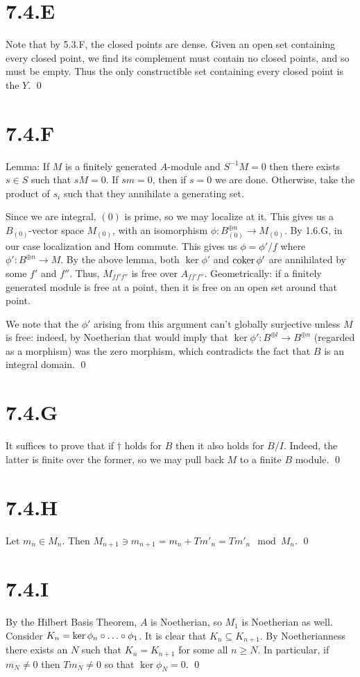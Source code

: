 \documentclass{article}
\begin{document}
\section{7.4.E}
Note that by 5.3.F, the closed points are dense. Given an open set containing
every closed point, we find its complement must contain no closed points, and
so must be empty. Thus the only constructible set containing every closed point
is the $Y$. \qed

\section{7.4.F}
Lemma: If $M$ is a finitely generated
$A$-module and $S^{-1}M=0$ then there exists
$s \in S$ such that $sM=0$. If
$sm=0$, then if $s=0$ we are done.
Otherwise, take the product of $s_i$ such that they
annihilate a generating set.

Since we are integral, $(0)$ is prime, so we may localize at
it. This gives us a $B_{(0)}$-vector space
$M_{(0)}$, with an isomorphism $\phi: B_{(0)}^{\oplus n} \to M_{(0)}$. By 1.6.G,
in our case localization and Hom commute. This gives us $\phi=\phi'/f$
where $\phi': B^{\oplus n} \to M$. By the above lemma, both $\ker \phi'$
and $\operatorname{coker} \phi'$ are annihilated by some $f'$ and
$f''$. Thus, $M_{ff'f''}$ is free over
$A_{ff'f''}$. Geometrically: if a finitely generated module is free
at a point, then it is free on an open set around that point.

We note that the $\phi'$ arising from this argument can't
globally surjective unless $M$ is free: indeed, by
Noetherian that would imply that $\ker \phi': B^{\oplus l} \to B^{\oplus n}$ (regarded as a
morphism) was the zero morphism, which contradicts the fact that
$B$ is an integral domain. \qed

\section{7.4.G}
It suffices to prove that if $\dagger$ holds for
$B$ then it also holds for $B/I$. Indeed,
the latter is finite over the former, so we may pull back
$M$ to a finite $B$ module. \qed

\section{7.4.H}
Let $m_n \in M_n$. Then $M_{n+1} \ni
    m_{n+1}=m_n+Tm'_n=Tm'_n \mod M_n$. \qed

\section{7.4.I}
By the Hilbert Basis Theorem, $A$ is Noetherian, so
$M_1$ is Noetherian as well. Consider
$K_n=\ker \phi_n\after \dots \after \phi_1$. It is clear that $K_n \subseteq K_{n+1}$. By
Noetherianness there exists an $N$ such that
$K_n=K_{n+1}$ for some all $n \geq N$. In particular, if
$m_N \neq 0$ then $Tm_N \neq 0$ so that
$\ker \phi_N = 0$. \qed
\end{document}
